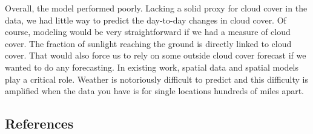 \documentclass[
  letterpaper,
  DIV=11,
  numbers=noendperiod]{scrartcl}
\begin{document}
Overall, the model performed poorly. Lacking a solid proxy for cloud
cover in the data, we had little way to predict the day-to-day changes
in cloud cover. Of course, modeling would be very straightforward if we
had a measure of cloud cover. The fraction of sunlight reaching the
ground is directly linked to cloud cover. That would also force us to
rely on some outside cloud cover forecast if we wanted to do any
forecasting. In existing work, spatial data and spatial models play a
critical role. Weather is notoriously difficult to predict and this
difficulty is amplified when the data you have is for single locations
hundreds of miles apart.

\hypertarget{references}{%
\subsection*{References}\label{references}}
\end{document}
